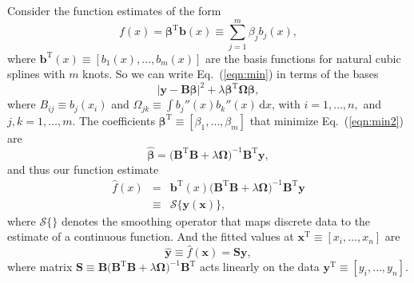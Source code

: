 \documentclass[prd,twocolumn,amsmath,amssymb,floatfix,superscriptaddress]{revtex4-1}
\newcommand{\dr}{\mathrm{d}}
\begin{document}
Consider the function estimates of the form
\begin{equation}
    f(x) = {\boldsymbol\beta}^\mathrm{T} \mathbf{b}(x) \equiv \sum_{j=1}^m \beta_j b_j(x),
\end{equation}
where $\mathbf{b}^\mathrm{T}(x) \equiv [b_1(x), \ldots, b_m(x)]$
are the basis functions for natural cubic splines with $m$ knots.
So we can write Eq.~(\ref{eqn:min}) in terms of the bases
\begin{equation}
    \big|\mathbf{y} - \mathbf{B}{\boldsymbol\beta}\big|^2
    + \lambda{\boldsymbol\beta}^\mathrm{T}\boldsymbol{\Omega\beta},
    \label{eqn:min2}
\end{equation}
where $B_{ij} \equiv b_j(x_i)$ and $\Omega_{jk} \equiv \int b_j''(x) b_k''(x)\,\dr x$,
with $i=1,\ldots,n,$ and $j,k=1,\ldots,m$.
The coefficients $\boldsymbol\beta^\mathrm{T}\equiv[\beta_1, \ldots, \beta_m]$
that minimize Eq.~(\ref{eqn:min2}) are
\begin{equation}
    \hat{\boldsymbol\beta} = \big( \mathbf{B}^\mathrm{T}\mathbf{B} + \lambda{\boldsymbol\Omega} \big)^{-1}
    \mathbf{B}^\mathrm{T}\mathbf{y},
\end{equation}
and thus our function estimate
\begin{eqnarray}
    \hat f(x) &=& \mathbf{b}^\mathrm{T}(x)
    \big( \mathbf{B}^\mathrm{T}\mathbf{B} + \lambda{\boldsymbol\Omega} \big)^{-1}
    \mathbf{B}^\mathrm{T}\mathbf{y} \nonumber\\
    &\equiv& \mathcal{S}\{\mathbf{y}(\mathbf{x})\},
    \label{eqn:magic}
\end{eqnarray}
where $\mathcal{S}\{\}$ denotes the smoothing operator
that maps discrete data to the estimate of a continuous function.
And the fitted values at $\mathbf{x}^\mathrm{T}\equiv[x_i,\ldots, x_n]$ are
\begin{equation}
    \hat{\mathbf{y}} \equiv \hat f(\mathbf{x}) = \mathbf{Sy},
\end{equation}
where matrix $\mathbf{S}\equiv\mathbf{B}
\big( \mathbf{B}^\mathrm{T}\mathbf{B} + \lambda{\boldsymbol\Omega} \big)^{-1}
\mathbf{B}^\mathrm{T}$ acts linearly on
the data $\mathbf{y}^\mathrm{T}\equiv[y_i,\ldots,y_n]$.
\end{document}
